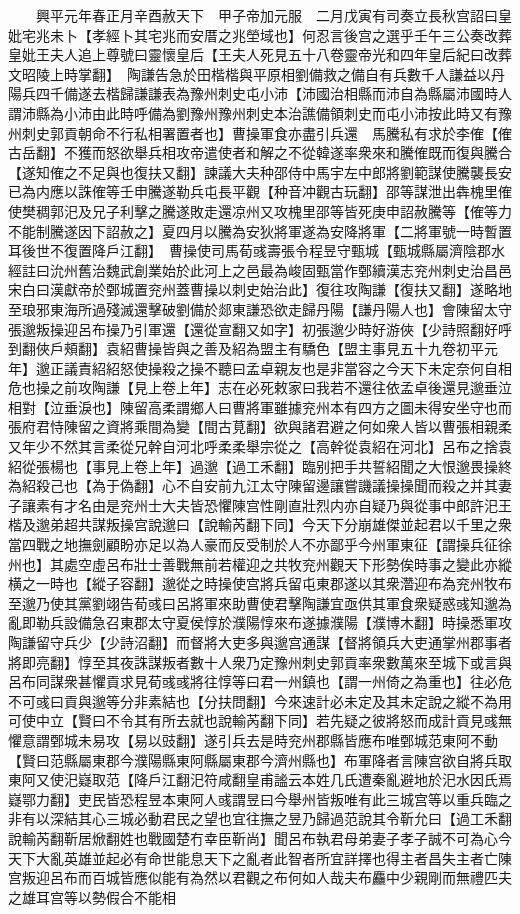 　　興平元年春正月辛酉赦天下　甲子帝加元服　二月戊寅有司奏立長秋宫詔曰皇妣宅兆未卜【孝經卜其宅兆而安厝之兆塋域也】何忍言後宫之選乎壬午三公奏改葬皇妣王夫人追上尊號曰靈懷皇后【王夫人死見五十八卷靈帝光和四年皇后紀曰改葬文昭陵上時掌翻】　陶謙告急於田楷楷與平原相劉備救之備自有兵數千人謙益以丹陽兵四千備遂去楷歸謙謙表為豫州刺史屯小沛【沛國治相縣而沛自為縣屬沛國時人謂沛縣為小沛由此時呼備為劉豫州豫州刺史本治譙備領刺史而屯小沛按此時又有豫州刺史郭貢朝命不行私相署置者也】曹操軍食亦盡引兵還　馬騰私有求於李傕【傕古岳翻】不獲而怒欲舉兵相攻帝遣使者和解之不從韓遂率衆來和騰傕既而復與騰合【遂知傕之不足與也復扶又翻】諫議大夫种邵侍中馬宇左中郎將劉範謀使騰襲長安已為内應以誅傕等壬申騰遂勒兵屯長平觀【种音冲觀古玩翻】邵等謀泄出犇槐里傕使樊稠郭汜及兄子利擊之騰遂敗走還凉州又攻槐里邵等皆死庚申詔赦騰等【傕等力不能制騰遂因下詔赦之】夏四月以騰為安狄將軍遂為安降將軍【二將軍號一時暫置耳後世不復置降戶江翻】　曹操使司馬荀彧壽張令程昱守甄城【甄城縣屬濟陰郡水經註曰沇州舊治魏武創業始於此河上之邑最為峻固甄當作鄄續漢志兖州刺史治昌邑宋白曰漢獻帝於鄄城置兖州蓋曹操以刺史始治此】復往攻陶謙【復扶又翻】遂略地至琅邪東海所過殘滅還擊破劉備於郯東謙恐欲走歸丹陽【謙丹陽人也】會陳留太守張邈叛操迎呂布操乃引軍還【還從宣翻又如字】初張邈少時好游俠【少詩照翻好呼到翻俠戶頰翻】袁紹曹操皆與之善及紹為盟主有驕色【盟主事見五十九卷初平元年】邈正議責紹紹怒使操殺之操不聽曰孟卓親友也是非當容之今天下未定奈何自相危也操之前攻陶謙【見上卷上年】志在必死敕家曰我若不還往依孟卓後還見邈垂泣相對【泣垂淚也】陳留高柔謂鄉人曰曹將軍雖據兖州本有四方之圖未得安坐守也而張府君恃陳留之資將乘間為變【間古莧翻】欲與諸君避之何如衆人皆以曹張相親柔又年少不然其言柔從兄幹自河北呼柔柔舉宗從之【高幹從袁紹在河北】呂布之捨袁紹從張楊也【事見上卷上年】過邈【過工禾翻】臨别把手共誓紹聞之大恨邈畏操終為紹殺己也【為于偽翻】心不自安前九江太守陳留邊讓嘗譏議操操聞而殺之并其妻子讓素有才名由是兖州士大夫皆恐懼陳宫性剛直壯烈内亦自疑乃與從事中郎許汜王楷及邈弟超共謀叛操宫說邈曰【說輸芮翻下同】今天下分崩雄傑並起君以千里之衆當四戰之地撫劍顧盼亦足以為人豪而反受制於人不亦鄙乎今州軍東征【謂操兵征徐州也】其處空虛呂布壯士善戰無前若權迎之共牧兖州觀天下形勢俟時事之變此亦縱横之一時也【縱子容翻】邈從之時操使宫將兵留屯東郡遂以其衆濳迎布為兖州牧布至邈乃使其黨劉翊告荀彧曰呂將軍來助曹使君擊陶謙宜亟供其軍食衆疑惑彧知邈為亂即勒兵設備急召東郡太守夏侯惇於濮陽惇來布遂據濮陽【濮博木翻】時操悉軍攻陶謙留守兵少【少詩沼翻】而督將大吏多與邈宫通謀【督將領兵大吏通掌州郡事者將即亮翻】惇至其夜誅謀叛者數十人衆乃定豫州刺史郭貢率衆數萬來至城下或言與呂布同謀衆甚懼貢求見荀彧彧將往惇等曰君一州鎮也【謂一州倚之為重也】往必危不可彧曰貢與邈等分非素結也【分扶問翻】今來速計必未定及其未定說之縱不為用可使中立【賢曰不令其有所去就也說輸芮翻下同】若先疑之彼將怒而成計貢見彧無懼意謂鄄城未易攻【易以豉翻】遂引兵去是時兖州郡縣皆應布唯鄄城范東阿不動【賢曰范縣屬東郡今濮陽縣東阿縣屬東郡今濟州縣也】布軍降者言陳宫欲自將兵取東阿又使汜嶷取范【降戶江翻汜符咸翻皇甫謐云本姓几氏遭秦亂避地於汜水因氏焉嶷鄂力翻】吏民皆恐程昱本東阿人彧謂昱曰今舉州皆叛唯有此三城宫等以重兵臨之非有以深結其心三城必動君民之望也宜往撫之昱乃歸過范說其令靳允曰【過工禾翻說輸芮翻靳居焮翻姓也戰國楚冇幸臣靳尚】聞呂布執君母弟妻子孝子誠不可為心今天下大亂英雄並起必有命世能息天下之亂者此智者所宜詳擇也得主者昌失主者亡陳宫叛迎呂布而百城皆應似能有為然以君觀之布何如人哉夫布麤中少親剛而無禮匹夫之雄耳宫等以勢假合不能相